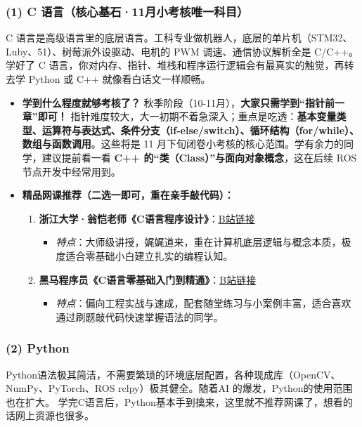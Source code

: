\documentclass[a4paper,11pt,oneside]{scrreprt}
\begin{document}
\subsubsection*{(1) C 语言（核心基石·11月小考核唯一科目）}

C 语言是高级语言里的底层语言。工科专业做机器人，底层的单片机（STM32、Luby、51）、树莓派外设驱动、电机的 PWM 调速、通信协议解析全是 C/C++。学好了 C 语言，你对内存、指针、堆栈和程序运行逻辑会有最真实的触觉，再转去学 Python 或 C++ 就像看白话文一样顺畅。

\begin{itemize}
    \item \textbf{学到什么程度就够考核了？}
    秋季阶段（10-11月），\textbf{大家只需学到“指针前一章”即可！} 指针难度较大，大一初期不着急深入；重点是吃透：\textbf{基本变量类型、运算符与表达式、条件分支（if-else/switch）、循环结构（for/while）、数组与函数调用}。这些将是 11 月下旬闭卷小考核的核心范围。学有余力的同学，建议提前看一看 \textbf{C++ 的“类（Class）”与面向对象概念}，这在后续 ROS 节点开发中经常用到。
    \item \textbf{精品网课推荐（二选一即可，重在亲手敲代码）：}
    \begin{enumerate}
        \item \textbf{浙江大学·翁恺老师《C语言程序设计》}：\href{https://www.bilibili.com/video/BV1dr4y1n7vA/}{\underline{B站链接}}
        \begin{itemize}
            \item \textit{特点}：大师级讲授，娓娓道来，重在计算机底层逻辑与概念本质，极度适合零基础小白建立扎实的编程认知。
        \end{itemize}
        \item \textbf{黑马程序员《C语言零基础入门到精通》}：\href{https://www.bilibili.com/video/BV1Xa4y1k7LU/}{\underline{B站链接}}
        \begin{itemize}
            \item \textit{特点}：偏向工程实战与速成，配套随堂练习与小案例丰富，适合喜欢通过刷题敲代码快速掌握语法的同学。
        \end{itemize}
    \end{enumerate}
\end{itemize}

\subsubsection*{(2) Python}

Python语法极其简洁，不需要繁琐的环境底层配置，各种现成库（OpenCV、NumPy、PyTorch、ROS rclpy）极其健全。随着AI 的爆发，Python的使用范围也在扩大。
学完C语言后，Python基本手到擒来，这里就不推荐网课了，想看的话网上资源也很多。
\end{document}
